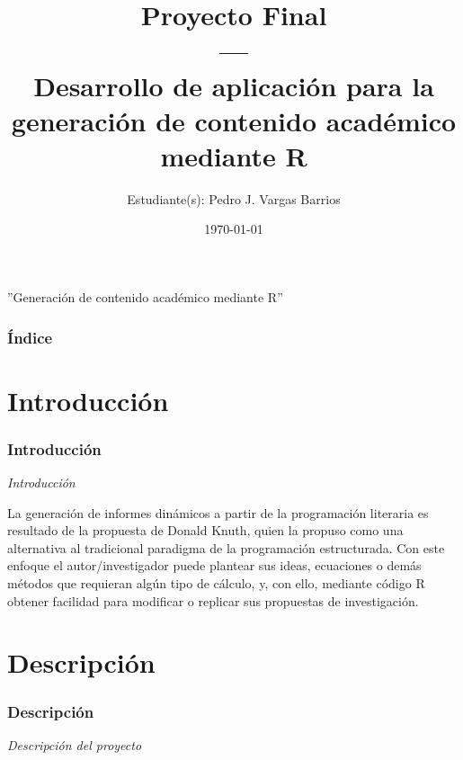 \documentclass[11pt]{beamer}					%
\title{Proyecto Final \\ --- \\ Desarrollo de aplicación para la generación de
contenido académico mediante R}
\author{Estudiante(s): Pedro J. Vargas Barrios}
\institute[UD]{Universidad Distrital Francisco José de Caldas}
\date{\today}
\begin{document}
	
	
	\begin{frame}[fragile]							%
		\titlepage 
		\begin{small}
			''Generación de contenido académico mediante R''
		\end{small}
	\end{frame}	

    	\begin{frame}[fragile]							%
		\frametitle{Índice}	
		\tableofcontents
	\end{frame}	

\section{Introducción}
		 \begin{frame}[fragile]						%
			\frametitle{Introducción}
			\begin{huge}
			\begin{center}
				\emph{\textit{Introducción}}
			\end{center}
			\end{huge}
La generación de informes dinámicos a partir de la programación literaria es resultado de la propuesta de Donald Knuth, quien la propuso como una alternativa al tradicional paradigma de la programación estructurada. Con este enfoque el autor/investigador puede plantear sus ideas, ecuaciones o demás métodos que requieran algún tipo de cálculo, y, con ello, mediante código R obtener facilidad para modificar o replicar sus propuestas de investigación.\\
			
		\end{frame}	

			
\section{Descripción}	
		 \begin{frame}[fragile]
			\frametitle{Descripción}
			\begin{huge}
			\begin{center}
				\emph{\textit{Descripción del proyecto}}
			\end{center}
			\end{huge}
		\end{frame}		
		   		
\end{document}
